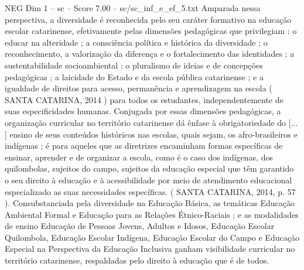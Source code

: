 \begin{textsample}{NEG Dim 1 – sc – Score 7.00 – sc/sc\_inf\_e\_ef\_5.txt}
Amparada nessa perspectiva, a diversidade é reconhecida pelo seu caráter formativo na educação escolar catarinense, efetivamente pelas dimensões pedagógicas que privilegiam : o educar na alteridade ; a consciência política e histórica da diversidade ; o reconhecimento, a valorização da diferença e o fortalecimento das identidades ; a sustentabilidade socioambiental ; o pluralismo de ideias e de concepções pedagógicas ; a laicidade do Estado e da escola pública catarinense ; e a igualdade de direitos para acesso, permanência e aprendizagem na escola ( SANTA CATARINA, 2014 ) para todos os estudantes, independentemente de suas especificidades humanas.
Conjugada por essas dimensões pedagógicas, a organização curricular no território catarinense dá ênfase à obrigatoriedade do [... ] ensino de seus conteúdos históricos nas escolas, quais sejam, os afro-brasileiros e indígenas ; é para aqueles que as diretrizes encaminham formas específicas de ensinar, aprender e de organizar a escola, como é o caso dos indígenas, dos quilombolas, sujeitos do campo, sujeitos da educação especial que têm garantido o seu direito à educação e à acessibilidade por meio de atendimento educacional especializado as suas necessidades específicas. ( SANTA CATARINA, 2014, p. 57 ).
Consubstanciada pela diversidade na Educação Básica, as temáticas Educação Ambiental Formal e Educação para as Relações Étnico-Raciais ; e as modalidades de ensino Educação de Pessoas Jovens, Adultos e Idosos, Educação Escolar Quilombola, Educação Escolar Indígena, Educação Escolar do Campo e Educação Especial na Perspectiva da Educação Inclusiva ganham visibilidade curricular no território catarinense, respaldadas pelo direito à educação que é de todos.

\end{textsample}
